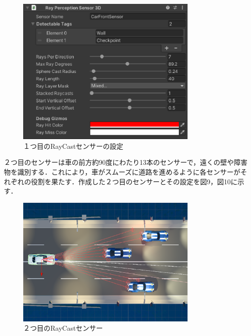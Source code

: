 \begin{figure}[H]
    \centering
    \includegraphics[width=0.8\textwidth]{figures/FirstRaycastSettings.eps} %
    \caption{１つ目のRayCastセンサーの設定} %
    \label{fig:first-raycast-settings} %
\end{figure}

２つ目のセンサーは車の前方約90度にわたり13本のセンサーで，遠くの壁や障害物を識別する．これにより，車がスムーズに道路を進めるように各センサーがそれぞれの役割を果たす．作成した２つ目のセンサーとその設定を図9，図10に示す．
\begin{figure}[H]
    \centering
    \includegraphics[width=0.8\textwidth]{figures/SecondRaycast.eps} %
    \caption{２つ目のRayCastセンサー} %
    \label{fig:second-raycast} %
\end{figure}

